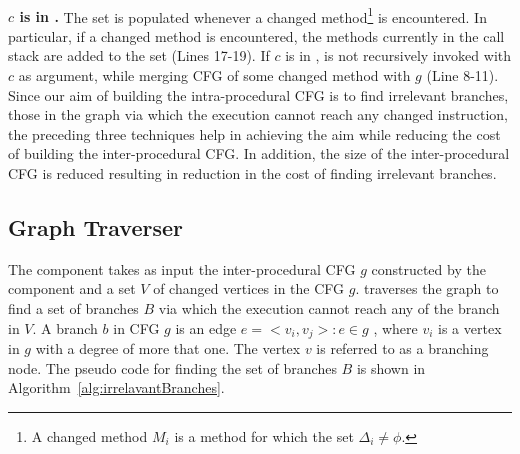 \\ \textbf{ $c$ is in .} The set  is populated whenever a changed method\footnote{\scriptsize{A changed method $M_i$ is a method for which the set $\Delta_i \neq \phi $.}} is encountered. In particular, if a changed method is encountered, the methods currently in the call stack are added to the set   (Lines 17-19). If $c$ is in ,  is not recursively invoked with $c$ as argument, while merging CFG of some changed method with $g$ (Line 8-11).
Since our aim of building the intra-procedural CFG is to find irrelevant branches, those in the graph via which the execution cannot reach any changed instruction, the preceding three techniques help in achieving the aim while reducing the cost of building the inter-procedural CFG. In addition, the size of the inter-procedural CFG is reduced resulting in reduction in the cost of finding irrelevant branches.

\subsection{Graph Traverser}
The  component takes as input the inter-procedural CFG $g$ constructed by the  component and a set $V$ of changed vertices in the CFG $g$.  traverses the graph to find a set of branches $B$ via which the execution cannot reach any of the branch in $V$. A branch $b$ in CFG $g$ is an edge $e = <v_i, v_j>: e \in g$ , where $v_i$ is a vertex in $g$ with a degree of more that one. The vertex $v$ is referred to as a branching node. The pseudo code for finding the set of branches $B$ is shown in Algorithm~\ref{alg:irrelavantBranches}.

